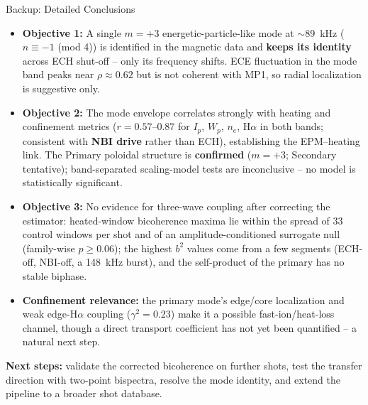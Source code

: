 \documentclass[aspectratio=169,xcolor=table]{beamer}
\begin{document}
\begin{frame}{Backup: Detailed Conclusions}
    \footnotesize
    \begin{itemize}
        \item \textbf{Objective 1:} A single $m=+3$ energetic-particle-like mode at
        $\sim$\SI{89}{kHz} ($n\equiv-1$ (mod 4)) is identified in the
        magnetic data and \textbf{keeps its identity}
        across ECH shut-off -- only its frequency shifts. ECE fluctuation in the mode band
        peaks near $\rho\approx0.62$ but is not coherent with MP1, so radial localization
        is suggestive only.
        \item \textbf{Objective 2:} The mode envelope correlates strongly with heating and
        confinement metrics ($r=0.57$--$0.87$ for $I_p$, $W_p$, $n_e$, H$\alpha$ in both
        bands; consistent with \textbf{NBI drive} rather than ECH), establishing the
        EPM--heating link. The Primary poloidal structure is \textbf{confirmed} ($m=+3$; Secondary
        tentative); band-separated scaling-model tests are inconclusive -- no model is
        statistically significant.
        \item \textbf{Objective 3:} No evidence for three-wave coupling after correcting the estimator: heated-window bicoherence maxima lie within the spread of 33 control windows per shot and of an amplitude-conditioned surrogate null (family-wise $p\ge0.06$); the highest $b^2$ values come from a few segments (ECH-off, NBI-off, a \SI{148}{kHz} burst), and the self-product of the primary has no stable biphase.
        \item \textbf{Confinement relevance:} the primary mode's edge/core
        localization and weak edge-H$\alpha$ coupling ($\gamma^2=0.23$) make it a
        possible fast-ion/heat-loss channel, though a direct transport
        coefficient has not yet been quantified -- a natural next step.
    \end{itemize}
    \vspace{0.2cm}
    \textbf{Next steps:} validate the corrected bicoherence on further shots, test the transfer direction with two-point bispectra, resolve the mode identity, and extend the pipeline to a broader shot database.
\end{frame}
\end{document}
